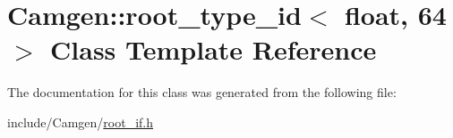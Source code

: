 \hypertarget{a00475}{\section{Camgen\-:\-:root\-\_\-type\-\_\-id$<$ float, 64 $>$ Class Template Reference}
\label{a00475}
}


The documentation for this class was generated from the following file\-:\begin{DoxyCompactItemize}
\item 
include/\-Camgen/\hyperlink{a00732}{root\-\_\-if.\-h}\end{DoxyCompactItemize}
